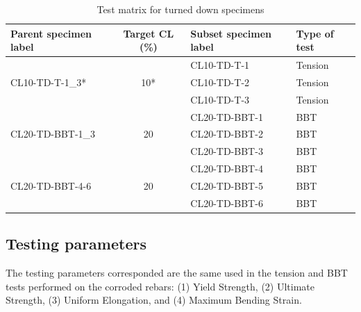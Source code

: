 \begin{table}[htbp]
\caption{Test matrix for turned down specimens}
\label{tab:turned_down_matrix}
\centering
\begin{tabular}{lcll}
Parent specimen label             & Target CL (\%)       & Subset specimen label & Type of test \\ \hline
\multirow{3}{*}{CL10-TD-T-1\_3*}  & \multirow{3}{*}{10*} & CL10-TD-T-1           & Tension      \\
                                  &                      & CL10-TD-T-2           & Tension      \\
                                  &                      & CL10-TD-T-3           & Tension      \\
\multirow{3}{*}{CL20-TD-BBT-1\_3} & \multirow{3}{*}{20}  & CL20-TD-BBT-1         & BBT          \\
                                  &                      & CL20-TD-BBT-2         & BBT          \\
                                  &                      & CL20-TD-BBT-3         & BBT          \\
\multirow{3}{*}{CL20-TD-BBT-4-6}  & \multirow{3}{*}{20}  & CL20-TD-BBT-4         & BBT          \\
                                  &                      & CL20-TD-BBT-5         & BBT          \\
                                  &                      & CL20-TD-BBT-6         & BBT         
\end{tabular}
\end{table}

\subsection{Testing parameters}
The testing parameters corresponded are the same used in the tension and BBT tests performed on the corroded rebars: (1) Yield Strength, (2) Ultimate Strength, (3) Uniform Elongation, and (4) Maximum Bending Strain.

